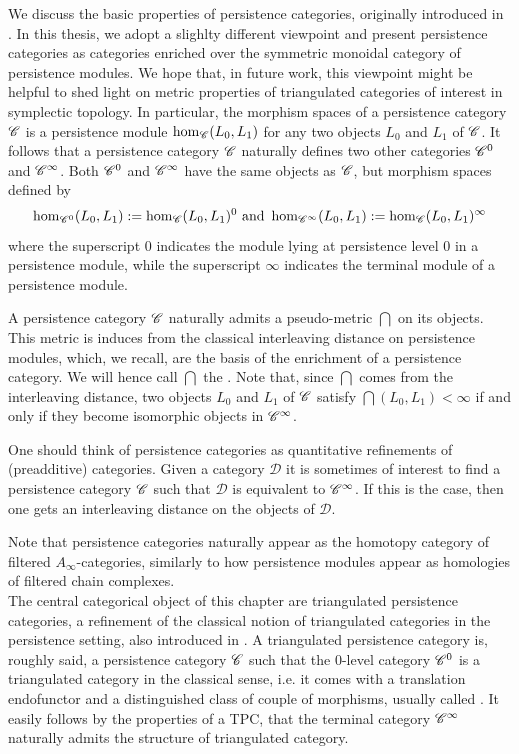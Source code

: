 We discuss the basic properties of persistence categories, originally introduced in \cite{BCZ:tpc}. In this thesis, we adopt a slighlty different viewpoint and present persistence categories as categories enriched over the symmetric monoidal category of persistence modules. We hope that, in future work, this viewpoint might be helpful to shed light on metric properties of triangulated categories of interest in symplectic topology. In particular, the morphism spaces of a persistence category ${\mathscr{C}}$ is a persistence module $\hom_{\mathscr{C}}(L_0,L_1)$ for any two objects $L_0$ and $L_1$ of ${\mathscr{C}}$. It follows that a persistence category ${\mathscr{C}}$ naturally defines two other categories ${\mathscr{C}}^0$ and ${\mathscr{C}}^\infty$. Both ${\mathscr{C}}^0$ and ${\mathscr{C}}^\infty$ have the same objects as ${\mathscr{C}}$, but morphism spaces defined by $$\hom_{{\mathscr{C}}^0}(L_0,L_1):= \hom_{\mathscr{C}}(L_0,L_1)^0 \text{   and   }\hom_{{\mathscr{C}}^\infty}(L_0,L_1):= \hom_{\mathscr{C}}(L_0,L_1)^\infty$$ where the superscript $0$ indicates the module lying at persistence level $0$ in a persistence module, while the superscript $\infty$ indicates the terminal module of a persistence module.

A persistence category ${\mathscr{C}}$ naturally admits a pseudo-metric $\dint$ on its objects. This metric is induces from the classical interleaving distance on persistence modules, which, we recall, are the basis of the enrichment of a persistence category. We will hence call $\dint$ the . Note that, since $\dint$ comes from the interleaving distance, two objects $L_0$ and $L_1$ of ${\mathscr{C}}$ satisfy $\dint(L_0,L_1)<\infty$ if and only if they become isomorphic objects in ${\mathscr{C}}^\infty$.

One should think of persistence categories as quantitative refinements of (preadditive) categories. Given a category $\mathcal{D}$ it is sometimes of interest to find a persistence category ${\mathscr{C}}$ such that $\mathcal{D}$ is equivalent to ${\mathscr{C}}^\infty$. If this is the case, then one gets an interleaving distance on the objects of $\mathcal{D}$.

Note that persistence categories naturally appear as the homotopy category of filtered $A_\infty$-categories, similarly to how persistence modules appear as homologies of filtered chain complexes.\\

The central categorical object of this chapter are triangulated persistence categories, a refinement of the classical notion of triangulated categories in the persistence setting, also introduced in \cite{BCZ:tpc}. A triangulated persistence category is, roughly said, a persistence category ${\mathscr{C}}$ such that the $0$-level category ${\mathscr{C}}^0$ is a triangulated category in the classical sense, i.e. it comes with a translation endofunctor and a distinguished class of couple of morphisms, usually called . It easily follows by the properties of a TPC, that the terminal category ${\mathscr{C}}^\infty$ naturally admits the structure of triangulated category.

